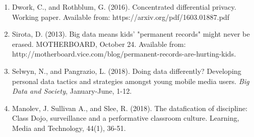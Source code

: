 \documentclass{article}
\begin{document}
\begin{enumerate}
    \label{45}
    \item Dwork, C., and Rothblum, G. (2016). Concentrated differential privacy. Working paper. Available from: https://arxiv.org/pdf/1603.01887.pdf
    \label{46}
    \item Sirota, D. (2013). Big data means kids' "permanent records" might never be erased. MOTHERBOARD, October 24. Available from: http://motherboard.vice.com/blog/permanent-records-are-hurting-kids.
    \label{47}
    \item Selwyn, N., and Pangrazio, L. (2018). Doing data differently? Developing personal data tactics and strategies amongst young mobile media users. \textit{ Big Data and Society}, January-June, 1-12.
    \label{48}
    \item Manolev, J. Sullivan A., and Slee, R. (2018). The datafication of discipline: Class Dojo, surveillance and a performative classroom culture. Learning, Media and Technology, 44(1), 36-51.
    
    
    

    

\end{enumerate}
\end{document}
